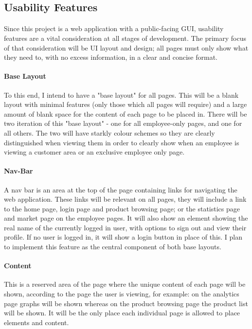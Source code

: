 ﻿\documentclass{article}
\begin{document}
        \subsection{Usability Features}
    \paragraph{}
    Since this project is a web application with a public-facing GUI, usability features are a vital consideration at all stages of development.
    The primary focus of that consideration will be UI layout and design; all pages must only show what they need to, with no excess information, in a clear and concise format.
    \paragraph{Base Layout}
    To this end, I intend to have a "base layout" for all pages.
    This will be a blank layout with minimal features (only those which all pages will require) and a large amount of blank space for the content of each page to be placed in.
    There will be two iteration of this "base layout" - one for all employee-only pages, and one for all others.
    The two will have starkly colour schemes so they are clearly distinguished when viewing them in order to clearly show when an employee is viewing a customer area or an exclusive employee only page.
    \paragraph{Nav-Bar}
    A nav bar is an area at the top of the page containing links for navigating the web application.
    These links will be relevant on all pages, they will include a link to the home page, login page and product browsing page; or the statistics page and market page on the employee pages.
    It will also show an element showing the real name of the currently logged in user, with options to sign out and view their profile.
    If no user is logged in, it will show a login button in place of this.
    I plan to implement this feature as the central component of both base layouts.
    \paragraph{Content}
    This is a reserved area of the page where the unique content of each page will be shown, according to the page the user is viewing, for example: on the analytics page graphs will be shown whereas on the product browsing page the product list will be shown.
    It will be the only place each individual page is allowed to place elements and content.
\end{document}
